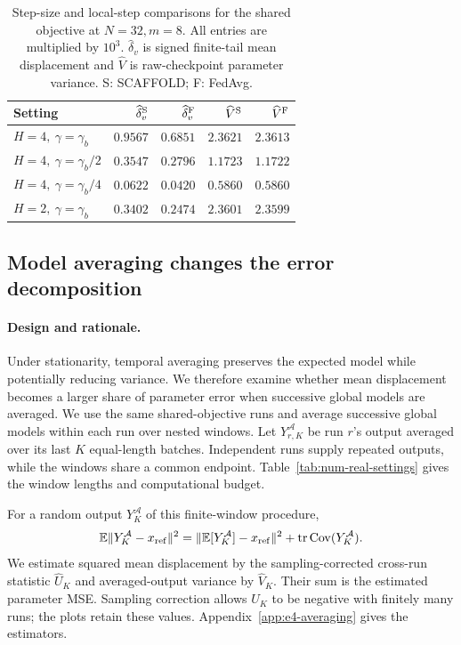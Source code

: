 \begin{table}[t]
\centering\small
\caption{Step-size and local-step comparisons for the shared objective at
$N=32,m=8$. All entries are multiplied by $10^3$.
$\widehat\delta_v$ is signed finite-tail mean displacement and
$\widehat V$ is raw-checkpoint parameter variance.
S: SCAFFOLD; F: FedAvg.}
\label{tab:supp-policy}
\begin{tabular}{@{}lrrrr@{}}\toprule
Setting & $\widehat\delta_v^{\rm S}$ & $\widehat\delta_v^{\rm F}$ & $\widehat V^{\rm S}$ & $\widehat V^{\rm F}$ \\ \midrule
$H=4,\ \gamma=\gamma_b$ & $0.9567$ & $0.6851$ & $2.3621$ & $2.3613$ \\
$H=4,\ \gamma=\gamma_b/2$ & $0.3547$ & $0.2796$ & $1.1723$ & $1.1722$ \\
$H=4,\ \gamma=\gamma_b/4$ & $0.0622$ & $0.0420$ & $0.5860$ & $0.5860$ \\
$H=2,\ \gamma=\gamma_b$ & $0.3402$ & $0.2474$ & $2.3601$ & $2.3599$ \\
\bottomrule
\end{tabular}
\end{table}

\FloatBarrier

\subsection{Model averaging changes the error decomposition}
\label{sec:num-averaging}

\paragraph{Design and rationale.}
Under stationarity, temporal averaging preserves the expected model
while potentially reducing variance. We therefore examine whether
mean displacement becomes a larger share of parameter error when
successive global models are averaged.
We use the same shared-objective runs and average successive global
models within each run over nested windows. Let $Y_{r,K}^{\mathcal A}$
be run $r$'s output averaged over its last $K$ equal-length batches.
Independent runs supply repeated outputs, while the windows share a
common endpoint. Table~\ref{tab:num-real-settings} gives the window
lengths and computational budget.

For a random output $Y_K^{\mathcal A}$ of this finite-window procedure,
\begin{equation}
\label{eq:e4-finite-window-mse}
\mathbb E\|Y_K^{\mathcal A}-x_{\rm ref}\|^2
=\|\mathbb E[Y_K^{\mathcal A}]-x_{\rm ref}\|^2
+\operatorname{tr}\operatorname{Cov}(Y_K^{\mathcal A}).
\end{equation}
We estimate squared mean displacement by the sampling-corrected cross-run
statistic $\widehat U_K$ and averaged-output variance by $\widehat V_K$.
Their sum is the estimated parameter MSE. Sampling correction allows
$\widehat U_K$ to be negative with finitely many runs; the plots retain
these values. Appendix~\ref{app:e4-averaging} gives the estimators.

